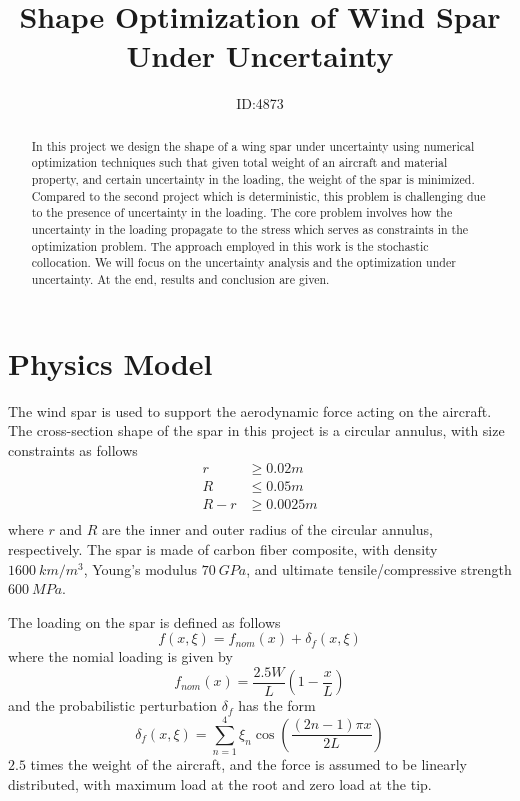 \documentclass[a4paper]{article}
\title{Shape Optimization of Wind Spar Under Uncertainty}
\author{ID:4873}
\begin{document}
 \maketitle
 
\begin{abstract}
   In this project we design the shape of a wing spar under uncertainty using numerical optimization techniques such that given total weight of an aircraft and material property, and certain uncertainty in the loading, the weight of the spar is minimized. Compared to the second project which is deterministic, this problem is challenging due to the presence of uncertainty in the loading. The core problem involves how the uncertainty in the loading propagate to the stress which serves as constraints in the optimization problem. The approach employed in this work is the stochastic collocation. We will focus on the uncertainty analysis and the optimization under uncertainty. At the end, results and conclusion are given.
\end{abstract}

\section{Physics Model} \label{sec:physics}
The wind spar is used to support the aerodynamic force acting on the aircraft. The cross-section shape of the spar in this project is a circular annulus, with size constraints as follows
\begin{equation}
\begin{aligned}
r &\ge 0.02m \\
R &\le 0.05m \\
R-r &\ge 0.0025m\\
\end{aligned}
\end{equation}
where $r$ and $R$ are the inner and outer radius of the circular annulus, respectively.
The spar is made of carbon fiber composite, with density $1600\:km/m^3$, Young's modulus $70\:GPa$, and ultimate tensile/compressive strength $600\: MPa$.

The loading on the spar is defined as follows
\begin{equation}
f(x,\xi) = f_{nom}(x) + \delta_{f}(x,\xi)
\end{equation}
where the nomial loading is given by
\begin{equation}
f_{nom}(x) = \frac{2.5W}{L}(1-\frac{x}{L})
\end{equation}
and the probabilistic perturbation $\delta_{f}$ has the form
\begin{equation}
\delta_{f}(x,\xi) = \sum_{n=1}^{4}\xi_n \cos(\frac{(2n-1)\pi x}{2L})
\end{equation}
 $2.5$ times the weight of the aircraft, and the force is assumed to be linearly distributed, with maximum load at the root and zero load at the tip.
\end{document}

